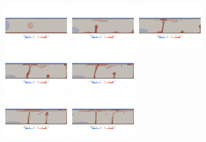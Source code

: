 \begin{center}
\includegraphics[width=3.5cm]{python_codes/fieldstone_88/results/model2/T0000.png}
\includegraphics[width=3.5cm]{python_codes/fieldstone_88/results/model2/T0001.png}
\includegraphics[width=3.5cm]{python_codes/fieldstone_88/results/model2/T0002.png}
\includegraphics[width=3.5cm]{python_codes/fieldstone_88/results/model2/T0003.png}
\includegraphics[width=3.5cm]{python_codes/fieldstone_88/results/model2/T0004.png}\\
\includegraphics[width=3.5cm]{python_codes/fieldstone_88/results/model2/T0005.png}
\includegraphics[width=3.5cm]{python_codes/fieldstone_88/results/model2/T0006.png}

\end{center}
